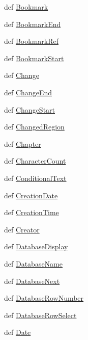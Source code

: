 \begin{DoxyCompactItemize}
\item 
def \hyperlink{namespaceodf_1_1text_a7bd87f75acc528f88020c54819e32fad}{Bookmark}
\item 
def \hyperlink{namespaceodf_1_1text_a332dfa7ef92f8f451fe91402d935c54c}{Bookmark\+End}
\item 
def \hyperlink{namespaceodf_1_1text_a1830074aab8065514c3b280b24f8991f}{Bookmark\+Ref}
\item 
def \hyperlink{namespaceodf_1_1text_ac4564bb5935e6fe1fd6d77cb8644253c}{Bookmark\+Start}
\item 
def \hyperlink{namespaceodf_1_1text_a6b5e2bf1edd6db490b699d42db4edc6d}{Change}
\item 
def \hyperlink{namespaceodf_1_1text_abf9658bb5567e164a169d64568a1da91}{Change\+End}
\item 
def \hyperlink{namespaceodf_1_1text_a5e00781eb37ef30677919948a17cd757}{Change\+Start}
\item 
def \hyperlink{namespaceodf_1_1text_a55eec5cf6ce5b5beb9575c881aed474a}{Changed\+Region}
\item 
def \hyperlink{namespaceodf_1_1text_a58b43f18fba7802e2bbcb07d4362d0fe}{Chapter}
\item 
def \hyperlink{namespaceodf_1_1text_a27aaf41490a25a767069c313122d96a4}{Character\+Count}
\item 
def \hyperlink{namespaceodf_1_1text_a9a601c2711515cc54028f20c96a0ca57}{Conditional\+Text}
\item 
def \hyperlink{namespaceodf_1_1text_a19c8abce17faa56ee85d31c1d3505b56}{Creation\+Date}
\item 
def \hyperlink{namespaceodf_1_1text_a041d201bd0bcad7fd40fdbc40a15547e}{Creation\+Time}
\item 
def \hyperlink{namespaceodf_1_1text_a741462cd9db766e92ed84eabe923f476}{Creator}
\item 
def \hyperlink{namespaceodf_1_1text_af4b982ac7f76d5a5fd31cdbf556b3e7d}{Database\+Display}
\item 
def \hyperlink{namespaceodf_1_1text_a9ef848523800f417375b5f2dea26f527}{Database\+Name}
\item 
def \hyperlink{namespaceodf_1_1text_aec109bf5110e7e6a70df899e93c44ea2}{Database\+Next}
\item 
def \hyperlink{namespaceodf_1_1text_afbc898d988a0bef4749cdfcfd01df553}{Database\+Row\+Number}
\item 
def \hyperlink{namespaceodf_1_1text_a8eac969a9da0dd00ec5214893cdaa466}{Database\+Row\+Select}
\item 
def \hyperlink{namespaceodf_1_1text_a0704d0a9c88591320af3cab0c622c645}{Date}

\end{DoxyCompactItemize}
